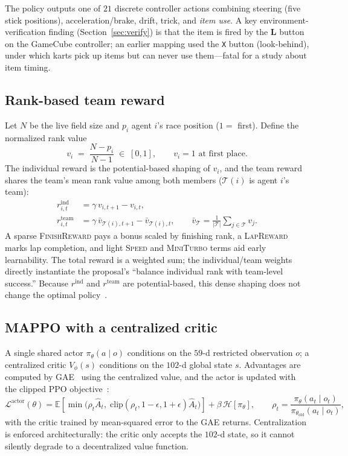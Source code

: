\documentclass{article}
\begin{document}
The policy outputs one of $21$ discrete controller actions combining steering
(five stick positions), acceleration/brake, drift, trick, and \emph{item use}.
A key environment-verification finding (Section~\ref{sec:verify}) is that the
item is fired by the \textbf{L} button on the GameCube controller; an earlier
mapping used the \texttt{X} button (look-behind), under which karts pick up items
but can never use them---fatal for a study about item timing.

\subsection{Rank-based team reward}

Let $N$ be the live field size and $p_i$ agent $i$'s race position
($1=$ first). Define the normalized rank value
\begin{equation}
  v_i \;=\; \frac{N - p_i}{N - 1} \;\in\; [0,1], \qquad v_i = 1 \text{ at first place.}
\end{equation}
The individual reward is the potential-based shaping of $v_i$, and the team
reward shares the team's mean rank value among both members
($\mathcal{T}(i)$ is agent $i$'s team):
\begin{align}
  r^{\text{ind}}_{i,t}  &= \gamma\,v_{i,t+1} - v_{i,t}, \\
  r^{\text{team}}_{i,t} &= \gamma\,\bar v_{\mathcal{T}(i),t+1} - \bar v_{\mathcal{T}(i),t},
  \qquad \bar v_{\mathcal{T}} = \tfrac{1}{|\mathcal{T}|}\textstyle\sum_{j\in\mathcal{T}} v_j .
\end{align}
A sparse \textsc{FinishReward} pays a bonus scaled by finishing rank, a
\textsc{LapReward} marks lap completion, and light \textsc{Speed} and
\textsc{MiniTurbo} terms aid early learnability. The total reward is a weighted
sum; the individual/team weights directly instantiate the proposal's
``balance individual rank with team-level success.'' Because $r^{\text{ind}}$
and $r^{\text{team}}$ are potential-based, this dense shaping does not change the
optimal policy~\citep{shaping}.

\subsection{MAPPO with a centralized critic}

A single shared actor $\pi_\theta(a\mid o)$ conditions on the $59$-d restricted
observation $o$; a centralized critic $V_\phi(s)$ conditions on the $102$-d
global state $s$. Advantages are computed by GAE~\citep{gae} using the
centralized value, and the actor is updated with the clipped PPO
objective~\citep{ppo}:
\begin{equation}
  \mathcal{L}^{\text{actor}}(\theta) =
  \mathbb{E}\!\left[\min\!\big(\rho_t \hat A_t,\;
  \mathrm{clip}(\rho_t, 1-\epsilon, 1+\epsilon)\hat A_t\big)\right]
  + \beta\, \mathcal{H}[\pi_\theta], \qquad
  \rho_t = \frac{\pi_\theta(a_t\mid o_t)}{\pi_{\theta_{\text{old}}}(a_t\mid o_t)},
\end{equation}
with the critic trained by mean-squared error to the GAE returns. Centralization
is enforced architecturally: the critic only accepts the $102$-d state, so it
cannot silently degrade to a decentralized value function.
\end{document}
